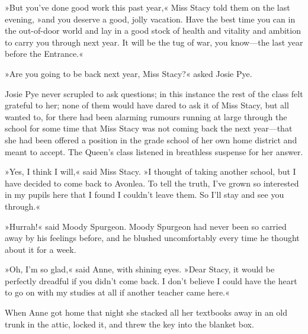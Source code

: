 »But you’ve done good work this past year,« Miss Stacy told them on the last evening, »and you deserve a good, jolly vacation. Have the best time you can in the out-of-door world and lay in a good stock of health and vitality and ambition to carry you through next year. It will be the tug of war, you know—the last year before the Entrance.«

»Are you going to be back next year, Miss Stacy?« asked Josie Pye.

Josie Pye never scrupled to ask questions; in this instance the rest of the class felt grateful to her; none of them would have dared to ask it of Miss Stacy, but all wanted to, for there had been alarming rumours running at large through the school for some time that Miss Stacy was not coming back the next year—that she had been offered a position in the grade school of her own home district and meant to accept. The Queen’s class listened in breathless suspense for her answer.

»Yes, I think I will,« said Miss Stacy. »I thought of taking another school, but I have decided to come back to Avonlea. To tell the truth, I’ve grown so interested in my pupils here that I found I couldn’t leave them. So I’ll stay and see you through.«

»Hurrah!« said Moody Spurgeon. Moody Spurgeon had never been so carried away by his feelings before, and he blushed uncomfortably every time he thought about it for a week.

»Oh, I’m so glad,« said Anne, with shining eyes. »Dear Stacy, it would be perfectly dreadful if you didn’t come back. I don’t believe I could have the heart to go on with my studies at all if another teacher came here.«

When Anne got home that night she stacked all her textbooks away in an old trunk in the attic, locked it, and threw the key into the blanket box.

